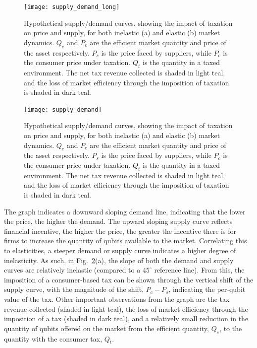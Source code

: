 \pubmode
\begin{figure}[!htbp]
\texttt{[image: supply\_demand\_long]}
\captionspacefig \caption{Hypothetical supply/demand curves, showing the impact of taxation on price and supply, for both inelastic (a) and elastic (b) market dynamics. $Q_e$ and $P_e$ are the efficient market quantity and price of the asset respectively. $P_s$ is the price faced by suppliers, while $P_c$ is the consumer price under taxation. $Q_t$ is the quantity in a taxed environment. The net tax revenue collected is shaded in light teal, and the loss of market efficiency through the imposition of taxation is shaded in dark teal.}\label{fig:supply_demand}	
\end{figure}
\else
\begin{figure}[!htbp]
\texttt{[image: supply\_demand]}
\captionspacefig \caption{Hypothetical supply/demand curves, showing the impact of taxation on price and supply, for both inelastic (a) and elastic (b) market dynamics. $Q_e$ and $P_e$ are the efficient market quantity and price of the asset respectively. $P_s$ is the price faced by suppliers, while $P_c$ is the consumer price under taxation. $Q_t$ is the quantity in a taxed environment. The net tax revenue collected is shaded in light teal, and the loss of market efficiency through the imposition of taxation is shaded in dark teal.}\label{fig:supply_demand}	
\end{figure}
\fi

The graph indicates a downward sloping demand line, indicating that the lower the price, the higher the demand. The upward sloping supply curve reflects financial incentive, the higher the price, the greater the incentive there is for firms to increase the quantity of qubits available to the market. Correlating this to elasticities, a steeper demand or supply curve indicates a higher degree of inelasticity. As such, in Fig.~\ref{fig:supply_demand}(a), the slope of both the demand and supply curves are relatively inelastic (compared to a $45^\circ$ reference line). From this, the imposition of a consumer-based tax can be shown through the vertical shift of the supply curve, with the magnitude of the shift, \mbox{$P_c - P_s$}, indicating the per-qubit value of the tax. Other important observations from the graph are the tax revenue collected (shaded in light teal), the loss of market efficiency through the imposition of a tax (shaded in dark teal), and a relatively small reduction in the quantity of qubits offered on the market from the efficient quantity, $Q_e$, to the quantity with the consumer tax, $Q_t$. 

